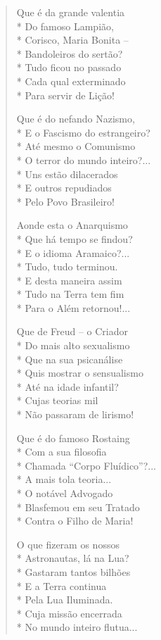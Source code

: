 \begin{verse}
Que é da grande valentia\\*
Do famoso Lampião,\\*
Corisco, Maria Bonita --\\*
Bandoleiros do sertão?\\*
Tudo ficou no passado\\*
Cada qual exterminado\\*
Para servir de Lição!

Que é do nefando Nazismo,\\*
E o Fascismo do estrangeiro?\\*
Até mesmo o Comunismo\\*
O terror do mundo inteiro?...\\*
Uns estão dilacerados\\*
E outros repudiados\\*
Pelo Povo Brasileiro!

Aonde esta o Anarquismo\\*
Que há tempo se findou?\\*
E o idioma Aramaico?...\\*
Tudo, tudo terminou.\\*
E desta maneira assim\\*
Tudo na Terra tem fim\\*
Para o Além retornou!...

Que de Freud --  o Criador\\*
Do mais alto sexualismo\\*
Que na sua psicanálise\\*
Quis mostrar o sensualismo\\*
Até na idade infantil?\\*
Cujas teorias mil\\*
Não passaram de lirismo!

Que é do famoso Rostaing\\*
Com a sua filosofia\\*
Chamada ``Corpo Fluídico''?...\\*
A mais tola teoria...\\*
O notável Advogado\\*
Blasfemou em seu Tratado\\*
Contra o Filho de Maria!

O que fizeram os nossos\\*
Astronautas, lá na Lua?\\*
Gastaram tantos bilhões\\*
E a Terra continua\\*
Pela Lua Iluminada.\\*
Cuja missão encerrada\\*
No mundo inteiro flutua...


\end{verse}
